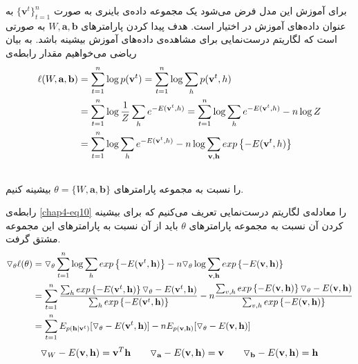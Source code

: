 برای آموزش این مدل فرض می‌‌شود یک مجموعه داده‌ی باینری به صورت
$\{\textbf{v}^{t}\}_{t=1}^{n}$
به عنوان داده‌های آموزش در اختیار است. هدف پیدا کردن پارامتر‌های
$W, \textbf{a}, \textbf{b}$
به صورتی‌ است که لگاریتم درست‌نمایی برای مشاهده‌ی داده‌های آموزش بیشینه باشد. به بیان ریاضی‌ می‌‌خواهیم مقدار رابطه‌ی
\begin{align}
	\centering
	\label{chap4-eq10}
	\ell(W, \textbf{a}, \textbf{b}) &= \sum_{t=1}^{n}\log p(\textbf{v}^t) = \sum_{t=1}^{n}\log \sum_h p(\textbf{v}^t, h)\\\nonumber
	&= \sum_{t=1}^{n}\log\dfrac{1}{Z} \sum_h e^{-E(\textbf{v}^t,h)} = \sum_{t=1}^{n}\log \sum_h e^{-E(\textbf{v}^t,h)} - n\log Z\\\nonumber
	&= \sum_{t=1}^{n}\log\sum_h e^{-E(\textbf{v}^t,h)} - n\log\sum_{\textbf{v},\textbf{h}}exp\left\lbrace -E(\textbf{v}^t,h)\right\rbrace\\\nonumber
\end{align}
را نسبت به مجموعه پارامتر‌های
$\theta = \{W, \textbf{a}, \textbf{b}\}$
بیشینه کنیم.

رابطه‌ی
\ref{chap4-eq10}
را معاد‌له‌ی لگاریتم درست‌نمایی تعریف می‌‌کنیم که برای بیشینه کردن آن نسبت به مجموعه پارامتر‌های
$\theta$
باید از آن نسبت به پارامترهای این مجموعه مشتق گرفت.
\begin{align}
	\centering
	\label{chap4-eq11}
	\triangledown_\theta \ell(\theta) &= \triangledown_\theta \sum_{t=1}^{n} \log \sum_h exp \left\lbrace -E(\textbf{v}^t, \textbf{h}) \right\rbrace - n\triangledown_\theta \log \sum_{\textbf{v}, \textbf{h}} exp \left\lbrace -E(\textbf{v}, \textbf{h}) \right\rbrace \\\nonumber
	&=\sum_{t=1}^{n} \dfrac{\sum_h exp \left\lbrace -E(\textbf{v}^t, \textbf{h}) \right\rbrace \triangledown_\theta -E(\textbf{v}^t, \textbf{h})}{\sum_h exp \left\lbrace -E(\textbf{v}^t, \textbf{h}) \right\rbrace} - n \dfrac{\sum_{v,h} exp \left\lbrace -E(\textbf{v}, \textbf{h}) \right\rbrace \triangledown_\theta -E(\textbf{v}, \textbf{h})}{\sum_{v,h} exp \left\lbrace -E(\textbf{v}, \textbf{h}) \right\rbrace}\\\nonumber
	&=\sum_{t=1}^{n}E_{p(\textbf{h}|\textbf{v}^t)}[\triangledown_\theta -E(\textbf{v}^t, \textbf{h})] - nE_{p(\textbf{v},\textbf{h})}[\triangledown_\theta -E(\textbf{v}, \textbf{h})]
\end{align}
\begin{align}
	\centering
	\label{chap4-eq12}
	\triangledown_{W} -E(\textbf{v},\textbf{h}) = \textbf{v}^T\textbf{h} \qquad  \triangledown_{\textbf{a}} -E(\textbf{v},\textbf{h}) = \textbf{v} \qquad  \triangledown_{\textbf{b}} -E(\textbf{v},\textbf{h}) = \textbf{h}
\end{align}

